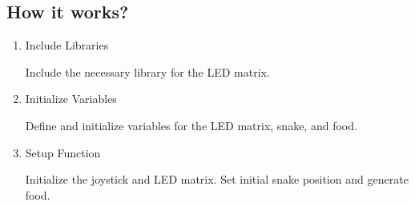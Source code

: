 \documentclass[a4paper,11pt,english]{sphinxmanual}
\begin{document}
\subsection{How it works?}
\label{\detokenize{Extension_Project/Greedy_Snake_Game:how-it-works}}\begin{enumerate}
%
\item {} 
\sphinxAtStartPar
Include Libraries

\sphinxAtStartPar
Include the necessary library for the LED matrix.

\begin{sphinxVerbatim}[commandchars=\\\{\}]
\end{sphinxVerbatim}

\item {} 
\sphinxAtStartPar
Initialize Variables

\sphinxAtStartPar
Define and initialize variables for the LED matrix, snake, and food.

\begin{sphinxVerbatim}[commandchars=\\\{\}]
\PYG{p}{[}\PYG{p}{]}\PYG{p}{[}\PYG{p}{]}
\PYG{p}{[}\PYG{p}{]}


\PYG{p}{[}\PYG{p}{]}
\end{sphinxVerbatim}

\item {} 
\sphinxAtStartPar
Setup Function

\sphinxAtStartPar
Initialize the joystick and LED matrix. Set initial snake position and generate food.


\end{enumerate}
\end{document}
